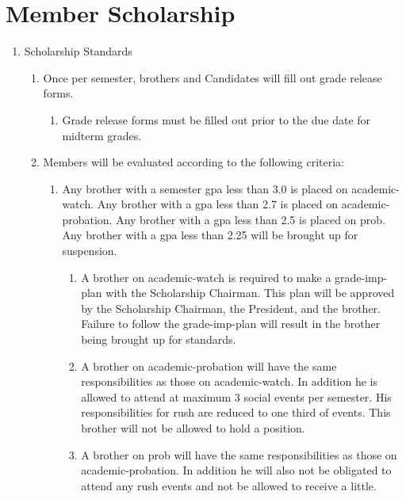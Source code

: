 \section{Member Scholarship}
	\label{member-schol-stds}
	\begin{enumerate}

	\item Scholarship Standards
		\begin{enumerate}
			\item Once per semester, brothers and Candidates will fill out grade release forms.
			\begin{enumerate}
				\item Grade release forms must be filled out prior to the due date for midterm grades.
			\end{enumerate}

			\item Members will be evaluated according to the following criteria:\label{academic-probation}	
			\begin{enumerate}
				\item Any brother with a semester \gls{gpa} less than 3.0 is placed on \gls{academic-watch}.  Any brother with a  \gls{gpa} less than 2.7 is placed on \gls{academic-probation}. Any brother with a \gls{gpa} less than 2.5 is placed on \gls{prob}. Any brother with a  \gls{gpa} less than 2.25 will be brought up for suspension.
				
				\begin{enumerate}
					\item A brother on \gls{academic-watch} is required to make a \gls{grade-imp-plan} with the Scholarship Chairman. This plan will be approved by the Scholarship Chairman, the President, and the brother. Failure to follow the \gls{grade-imp-plan} will result in the brother being brought up for standards.
					\label{academic-watch} 
					
					\item A brother on \gls{academic-probation} will have the same responsibilities as those on \gls{academic-watch}. In addition he is allowed to attend at maximum 3 social events per semester. His responsibilities for rush are reduced to one third of events. This brother will not be allowed to hold a position. \label{officer-eligibility}
					\label{academic-probation} 
					
					\item A brother on \gls{prob} will have the same responsibilities as those on \gls{academic-probation}.  In addition he will also not be obligated to attend any rush events and not be allowed to receive a little.
				\end{enumerate}


\end{enumerate}
\end{enumerate}
\end{enumerate}
